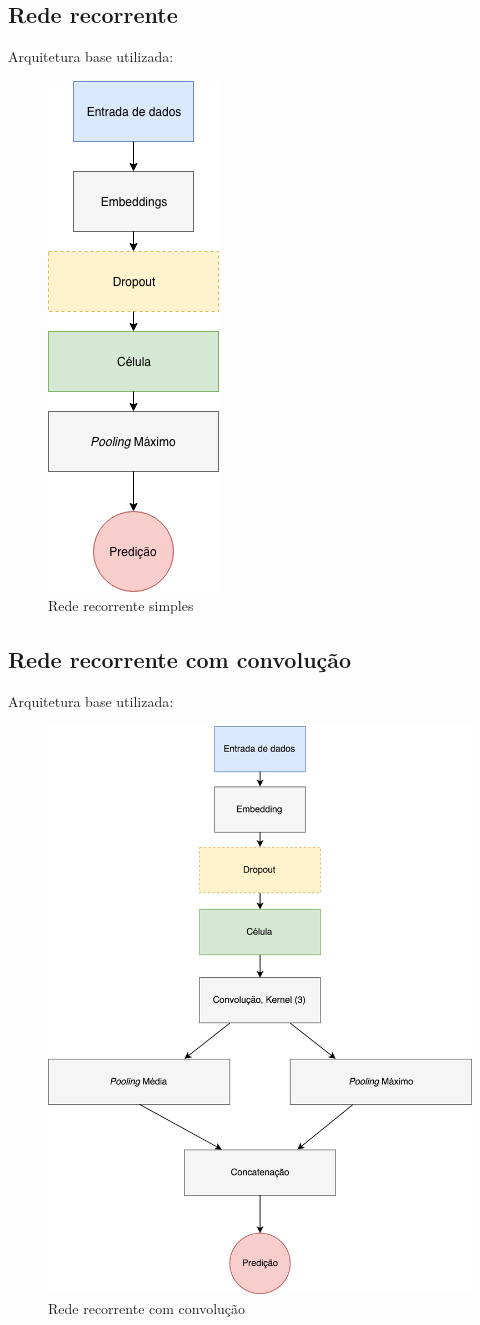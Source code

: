 \documentclass[12pt]{article}
\begin{document}
\subsection{Rede recorrente}

Arquitetura base utilizada:

\begin{figure}[!htb]
\centering
\includegraphics[width=.2\textwidth]{images/graph_2.png}
\caption{Rede recorrente simples}
\label{fig:graph_2}
\end{figure}

\subsection{Rede recorrente com convolução}

Arquitetura base utilizada:

\begin{figure}[!htb]
\centering
\includegraphics[width=.5\textwidth]{images/graph.png}
\caption{Rede recorrente com convolução}
\label{fig:graph}
\end{figure}
\end{document}
